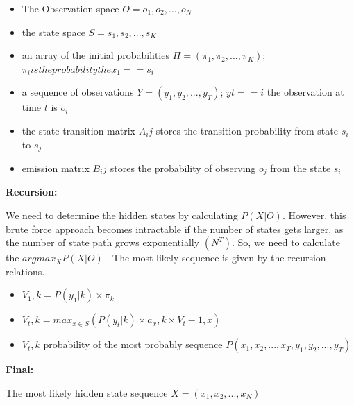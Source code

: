 \begin{itemize}


\item The Observation space $O =  {o_1,o_2,...,o_N}$

\item the state space $S = {s_1,s_2,...,s_K}$

\item an array of the initial probabilities $\Pi = (\pi_1, \pi_2,...,\pi_K)$; $\pi_i is the probability the x_1 == s_i$

\item a sequence of observations $Y = (y_1,y_2,...,y_T)$; $yt == i$ the observation at time $t$ is $o_i$

\item the state transition matrix $A_ij$ stores the transition probability from state $s_i$ to $s_j$


\item emission matrix $B_ij$ stores the probability of observing $o_j$ from the state $s_i$
\end{itemize}  

\textbf{Recursion:}

We need to determine the hidden states by calculating $P(X|O)$. However, this brute force approach becomes intractable if the number of states gets larger, as the number of state path grows exponentially $(N^T)$. So, we need to calculate the $argmax_X P(X|O)$ . The most likely sequence is given by the recursion relations.

\begin{center}

\begin{itemize}


\item $V_1,k = P (y_1|k) \times \pi_k$

\item $V_t,k = max_{x \in S} (P (y_t|k) \times a_x,k \times V_t-1,x)$

\item $V_t,k$ probability of the most probably sequence $P (x_1, x_2,...,x_T, y_1,y_2,...,y_T)$

\end{itemize}

\end{center}


\textbf{Final:}

The most likely hidden state sequence $X = (x_1,x_2,...,x_N)$ 

